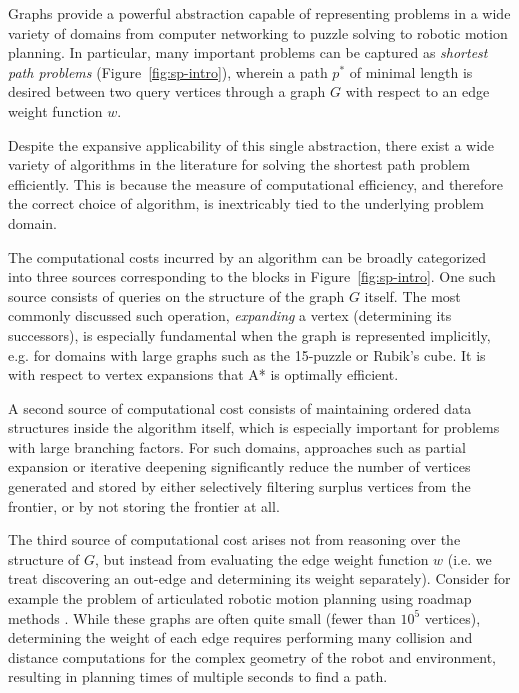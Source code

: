 Graphs provide a powerful abstraction
capable of representing problems in a wide variety of domains
from computer networking to puzzle solving
to robotic motion planning.
In particular,
many important problems can be captured
as \emph{shortest path problems} (Figure~\ref{fig:sp-intro}),
wherein a path $p^*$ of minimal length is desired
between two query vertices through a graph $G$
with respect to an edge weight function $w$.

Despite the expansive applicability of this single abstraction,
there exist a wide variety of algorithms in the literature
for solving the shortest path problem efficiently.
This is because the measure of computational efficiency,
and therefore the correct choice of algorithm,
is inextricably tied to the underlying problem domain.

The computational costs incurred by an algorithm
can be broadly categorized into three sources
corresponding to the blocks in Figure~\ref{fig:sp-intro}.
One such source consists of queries on the structure
of the graph $G$ itself.
The most commonly discussed such operation,
\emph{expanding} a vertex (determining its successors),
is especially fundamental
when the graph is represented implicitly,
e.g. for domains with large graphs
such as the 15-puzzle or Rubik's cube.
It is with respect to vertex expansions
that A* \citep{hart1968astar} is optimally efficient.

A second source of computational cost consists of maintaining
ordered data structures inside the algorithm itself,
which is especially important for problems with large branching
factors.
For such domains,
approaches such as partial expansion \citep{yoshizumi2000peastar}
or iterative deepening \citep{korf1985idastar}
significantly reduce the number of vertices generated and stored
by either selectively filtering surplus vertices from the frontier,
or by not storing the frontier at all.

The third source of computational cost arises not from reasoning
over the structure of $G$,
but instead from evaluating the edge weight function $w$
(i.e. we treat discovering an out-edge and determining its weight
separately).
Consider for example the problem of articulated robotic motion planning
using roadmap methods \citep{kavrakietal1996prm}.
While these graphs are often quite small
(fewer than $10^5$ vertices),
determining the weight of each edge requires performing many
collision and distance computations for the complex geometry
of the robot and environment,
resulting in planning times of multiple seconds to find a path.

